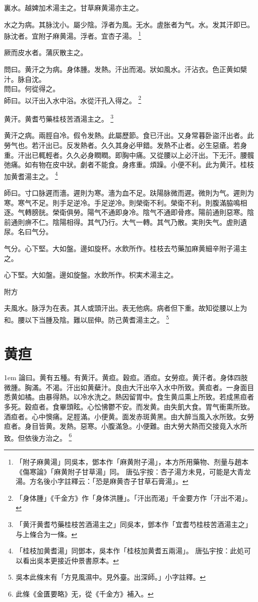裏水。越婢加术湯主之。甘草麻黄湯亦主之。

水之为病。其脉沈小。屬少陰。浮者为風。无水。虗胀者为气。水。发其汗即已。脉沈者。宜附子麻黄湯。浮者。宜杏子湯。
	\footnote{
		「附子麻黄湯」同吳本，鄧本作「麻黄附子湯」，本方所用藥物、剂量与趙本《傷寒論》「麻黄附子甘草湯」同。
		唐弘宇按：杏子湯方未見，可能是大青龙湯。方名後小字註釋云：「恐是麻黄杏子甘草石膏湯」。
	}

厥而皮水者。蒲灰散主之。

問曰。黄汗之为病。身体腫。发熱。汗出而渴。狀如風水。汗沾衣。色正黄如檗汁。脉自沈。\\
問曰。何從得之。\\
師曰。以汗出入水中浴。水從汗孔入得之。
	\footnote{
		「身体腫」《千金方》作「身体洪腫」。「汗出而渴」千金要方作「汗出不渴」。
	}

黄汗。黄耆芍藥桂枝苦酒湯主之。
	\footnote{
		「黄汗黄耆芍藥桂枝苦酒湯主之」同吳本，鄧本作「宜耆芍桂枝苦酒湯主之」与上條合为一條。
	}

黄汗之病。兩脛自冷。假令发熱。此屬歷節。食已汗出。又身常暮{\khaai 卧}盜汗出者。此勞气也。若汗出已。反发熱者。久久其身必甲錯。发熱不止者。必生惡瘡。若身重。汗出已輒輕者。久久必身瞤瞤。即胸中痛。又從腰以上必汗出。下无汗。腰髖弛痛。如有物在皮中狀。劇者不能食。身疼重。煩躁。小便不利。此为黄汗。桂枝加黄耆湯主之。
	\footnote{
		「桂枝加黄耆湯」同鄧本，吳本作「桂枝加黄耆五兩湯」。
		唐弘宇按：此処可以看出吳本更接近仲景書原本。
	}

師曰。寸口脉遲而濇。遲則为寒。濇为血不足。趺陽脉微而遲。微則为气。遲則为寒。寒气不足。則手足逆冷。手足逆冷。則榮衛不利。榮衛不利。則腹滿脇鳴相逐。气轉膀胱。榮衛俱勞。陽气不通即身冷。陰气不通即骨疼。陽前通則惡寒。陰前通則痹不仁。陰陽相得。其气乃行。大气一轉。其气乃散。実則失气。虗則遺尿。名曰气分。

气分。心下堅。大如盤。邊如旋杯。水飲所作。桂枝去芍藥加麻黄細辛附子湯主之。

心下堅。大如盤。邊如旋盤。水飲所作。枳実术湯主之。

附方

夫風水。脉浮为在表。其人或頭汗出。表无他病。病者但下重。故知從腰以上为和。腰以下当腫及陰。難以屈伸。防己黄耆湯主之。
	\footnote{
		吳本此條末有「方見風濕中。見外臺。出深師。」小字註釋。
	}

\chapter{黄疸}

\hangindent 1em
論曰。黄有五種。有黄汗。黄疸。穀疸。酒疸。女勞疸。黄汗者。身体四肢微腫。胸滿。不渴。汗出如黄蘗汁。良由大汗出卒入水中所致。黄疸者。一身面目悉黄如橘。由暴得熱。以冷水洗之。熱因留胃中。食生黄瓜熏上所致。若成黑疸者多死。穀疸者。食畢頭眩。心忪怫鬱不安。而发黄。由失飢大食。胃气衝熏所致。酒疸者。心中懊痛。足脛滿。小便黄。面发赤斑黄黑。由大醉当風入水所致。女勞疸者。身目皆黄。发熱。惡寒。小腹滿急。小便難。由大勞大熱而交接竟入水所致。但依後方治之。{\qianjin}
	\footnote{
		此條《金匱要略》无，從《千金方》補入。
	}


